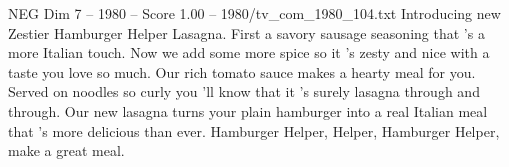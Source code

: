 \begin{textsample}{NEG Dim 7 – 1980 – Score 1.00 – 1980/tv\_com\_1980\_104.txt}  \label{ex:f7_neg_057}
Introducing new Zestier Hamburger Helper Lasagna.
First a savory sausage seasoning that 's a more Italian touch.
Now we add some more spice so it 's zesty and nice with a taste you love so much.
Our rich tomato sauce makes a hearty meal for you.
Served on noodles so curly you 'll know that it 's surely lasagna through and through.
Our new lasagna turns your plain hamburger into a real Italian meal that 's more delicious than ever.
Hamburger Helper, Helper, Hamburger Helper, make a great meal.

\end{textsample}
